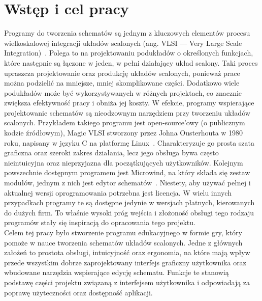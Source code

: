 \chapter{Wstęp i cel pracy}

Programy do tworzenia schematów są jednym z kluczowych elementów
procesu wielkoskalowej integracji układów scalonych (ang. VLSI — Very Large Scale Integration)~\cite{VLSI_insemi}.
Polega to na projektowaniu podukładów o określonych funkcjach,
które następnie są łączone w jeden, w pełni działający układ scalony.
Taki proces upraszcza projektowanie oraz produkcję układów scalonych, ponieważ prace można podzielić na mniejsze,
mniej skomplikowane części.
Dodatkowo wiele podukładów może być wykorzystywanych w różnych projektach,
co znacznie zwiększa efektywność pracy i obniża jej koszty.
W efekcie,
programy wspierające projektowanie schematów są nieodzownym narzędziem przy tworzeniu układów scalonych.
Przykładem takiego programu jest open-source'owy (o publicznym kodzie źródłowym),
Magic VLSI stworzony przez Johna Ousterhouta w 1980 roku,
napisany w języku C na platformę Linux~\cite{MAGIC_article}.
Charakteryzuje go prosta szata graficzna oraz szeroki zakres działania,
lecz jego obsługa bywa często nieintuicyjna oraz nieprzyjazna dla początkujących użytkowników.
Kolejnym powszechnie dostępnym programem jest Microwind,
na który składa się zestaw modułów,
jednym z nich jest edytor schematów~\cite{Microwind}.
Niestety, aby używać pełnej i aktualnej wersji oprogramowania potrzebna jest licencja.
W wielu innych przypadkach programy te są dostępne jedynie w wersjach płatnych, kierowanych do dużych firm.
To właśnie wysoki próg wejścia
i złożoność obsługi tego rodzaju programów stały się inspiracją do opracowania tego projektu.\\
\indent Celem tej pracy było stworzenie
programu edukacyjnego w formie gry, który pomoże w nauce tworzenia schematów układów scalonych.
Jedne z głównych założeń to prostota obsługi, intuicyjność oraz ergonomia,
na które mają wpływ przede wszystkim dobrze zaprojektowany interfejs graficzny użytkownika
oraz wbudowane narzędzia wspierające edycję schematu.
Funkcje te stanowią podstawę części projektu związaną z interfejsem użytkownika
i odpowiadają za poprawę użyteczności oraz dostępność aplikacji.\\
